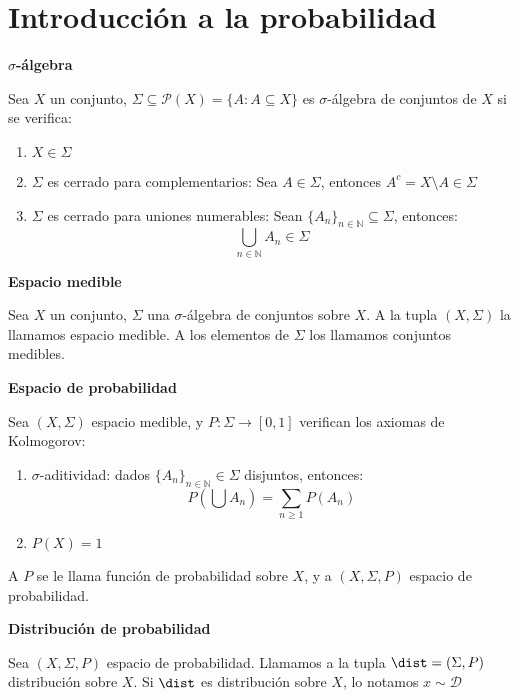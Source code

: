 \section{Introducción a la probabilidad}



\begin{definition} \textbf{$\sigma$-álgebra}

 Sea $X$ un conjunto, $\Sigma \subseteq \mathcal{P}(X) = \{A: A\subseteq X\}$ es $\sigma$-álgebra de conjuntos
 de $X$ si se verifica:
 
 \begin{enumerate}[i]
  \item $X \in \Sigma$
  \item $\Sigma$ es cerrado para complementarios: Sea $A\in \Sigma$, entonces $A^c = X\setminus A \in \Sigma$
  \item $\Sigma$ es cerrado para uniones numerables: Sean $\{A_n\}_{n\in\mathbb{N}} \subseteq \Sigma$, entonces: 
  \[\underset{n\in\mathbb{N}}{\bigcup} A_n \in \Sigma\]
 \end{enumerate}
\end{definition}

\begin{definition} \textbf{Espacio medible}

 Sea $X$ un conjunto, $\Sigma$ una $\sigma$-álgebra de conjuntos sobre $X$. A la tupla $(X,\Sigma)$ la llamamos
 espacio medible. A los elementos de $\Sigma$ los llamamos conjuntos medibles.
\end{definition}


\begin{definition} \textbf{Espacio de probabilidad}

 Sea $(X, \Sigma)$ espacio medible, y $P: \Sigma \rightarrow [0,1]$ verifican los axiomas de Kolmogorov:

 \begin{enumerate}[i]
  \item $\sigma$-aditividad: dados $\{A_n\}_{n\in \mathbb{N}} \in \Sigma$ disjuntos, entonces: 
  \[P \left(\bigcup A_n\right) = \sum_{n\ge 1} P(A_n)\]
  \item $P(X) = 1$
 \end{enumerate}

 A $P$ se le llama función de probabilidad sobre $X$, y a $(X, \Sigma, P)$ espacio de probabilidad.
\end{definition}

\begin{definition} \textbf{Distribución de probabilidad}

 Sea $(X, \Sigma, P)$ espacio de probabilidad. Llamamos a la tupla $\dist = (\Sigma,P)$ distribución sobre $X$. 
 Si $\dist$ es distribución sobre $X$, lo notamos $x\sim \mathcal{D}$
\end{definition}

